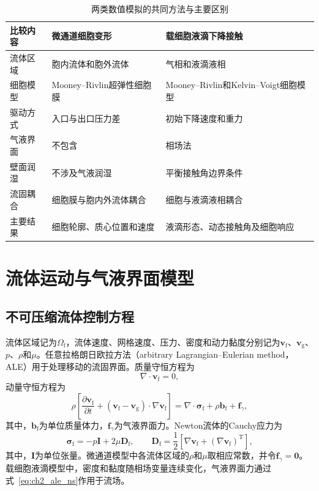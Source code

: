 \begin{table}[htbp]
\centering
\caption{两类数值模拟的共同方法与主要区别}
\label{tab:ch2_model_relation}
\renewcommand{\arraystretch}{1.18}
\begin{tabular}{p{}p{}p{}}
\toprule
比较内容 & 微通道细胞变形 & 载细胞液滴下降接触 \\
\midrule
流体区域 & 胞内流体和胞外流体 & 气相和液滴液相 \\
细胞模型 & Mooney--Rivlin超弹性细胞膜 & Mooney--Rivlin和Kelvin--Voigt细胞模型 \\
驱动方式 & 入口与出口压力差 & 初始下降速度和重力 \\
气液界面 & 不包含 & 相场法 \\
壁面润湿 & 不涉及气液润湿 & 平衡接触角边界条件 \\
流固耦合 & 细胞膜与胞内外流体耦合 & 细胞与液滴液相耦合 \\
主要结果 & 细胞轮廓、质心位置和速度 & 液滴形态、动态接触角及细胞响应 \\
\bottomrule
\end{tabular}
\end{table}

\section{流体运动与气液界面模型}

\subsection{不可压缩流体控制方程}

流体区域记为$\Omega_{\mathrm f}$，流体速度、网格速度、压力、密度和动力黏度分别记为$\boldsymbol{v}_{\mathrm f}$、$\boldsymbol{v}_{\mathrm g}$、$p$、$\rho$和$\mu$。任意拉格朗日欧拉方法（arbitrary Lagrangian--Eulerian method，ALE）用于处理移动的流固界面。质量守恒方程为
\begin{equation}
\nabla\cdot\boldsymbol{v}_{\mathrm f}=0,
\label{eq:ch2_continuity}
\end{equation}
动量守恒方程为
\begin{equation}
\rho\left[
\frac{\partial\boldsymbol{v}_{\mathrm f}}{\partial t}
+
\left(\boldsymbol{v}_{\mathrm f}-\boldsymbol{v}_{\mathrm g}\right)
\cdot\nabla\boldsymbol{v}_{\mathrm f}
\right]
=
\nabla\cdot\boldsymbol{\sigma}_{\mathrm f}
+
\rho\boldsymbol{b}_{\mathrm f}
+
\boldsymbol{f}_{\gamma},
\label{eq:ch2_ale_ns}
\end{equation}
其中，$\boldsymbol{b}_{\mathrm f}$为单位质量体力，$\boldsymbol{f}_{\gamma}$为气液界面力。Newton流体的Cauchy应力为
\begin{equation}
\boldsymbol{\sigma}_{\mathrm f}
=
-p\boldsymbol{I}
+2\mu\boldsymbol{D}_{\mathrm f},
\qquad
\boldsymbol{D}_{\mathrm f}
=
\frac{1}{2}\left[
\nabla\boldsymbol{v}_{\mathrm f}
+
\left(\nabla\boldsymbol{v}_{\mathrm f}\right)^{\mathrm T}
\right],
\label{eq:ch2_fluid_stress}
\end{equation}
其中，$\boldsymbol{I}$为单位张量。微通道模型中各流体区域的$\rho$和$\mu$取相应常数，并令$\boldsymbol{f}_{\gamma}=\boldsymbol{0}$。载细胞液滴模型中，密度和黏度随相场变量连续变化，气液界面力通过式~\eqref{eq:ch2_ale_ns}作用于流场\cite{hirt1974ale,hughes1981ale,donea2004ale}。

